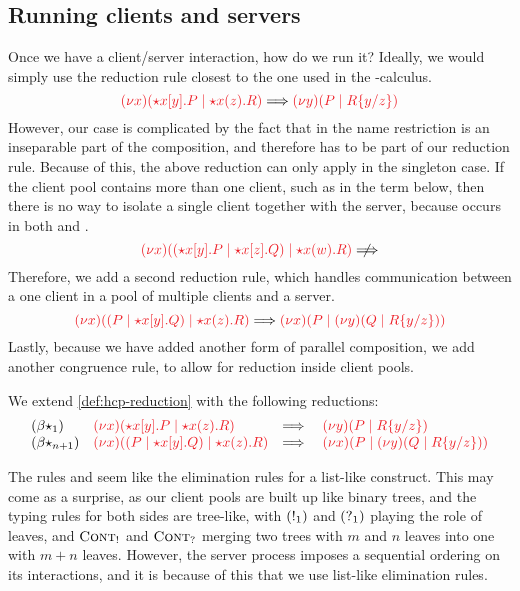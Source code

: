 \documentclass[UKenglish]{llncs}
\begin{document}
\subsection{Running clients and servers}
\label{sec:nc-running-clients-and-servers}
Once we have a client/server interaction, how do we run it? Ideally, we would
simply use the reduction rule closest to the one used in the \textpi-calculus. 
\[
  \reducesto
  {\tm{\cpCut{x}{\ncCnt{x}{y}{P}}{\ncSrv{x}{z}{R}}}}
  {\tm{\cpCut{y}{P}{\cpSub{y}{z}{R}}}}
\]
However, our case is complicated by the fact that in  the
name restriction is an inseparable part of the composition, and therefore has to
be part of our reduction rule. 
Because of this, the above reduction can only apply in the singleton case.
If the client pool contains more than one client, such as in the term below,
then there is no way to isolate a single client together with the server,
because  occurs in both  and .
\[
  \tm{\cpCut{x}{\ncPool{\ncCnt{x}{y}{P}}{\ncCnt{x}{z}{Q}}}{\ncSrv{x}{w}{R}}}
  \centernot\Longrightarrow
\]
Therefore, we add a second reduction rule, which handles communication between a
one client in a pool of multiple clients and a server.
\[
  \reducesto
  {\tm{\cpCut{x}{\ncPool{P}{\ncCnt{x}{y}{Q}}}{\ncSrv{x}{z}{R}}}}
  {\tm{\cpCut{x}{P}{\cpCut{y}{Q}{\cpSub{y}{z}{R}}}}}
\]
Lastly, because we have added another form of parallel composition, we add
another congruence rule, to allow for reduction inside client pools.
\begin{definition}[Reduction]\label{def:nc-reduction}
  We extend \cref{def:hcp-reduction} with the following reductions:
  \[
    \begin{array}{llll}
      \ncRedBetaStar{1}
      & \tm{\cpCut{x}{\ncCnt{x}{y}{P}}{\ncSrv{x}{z}{R}}}
      & \Longrightarrow \;
      & \tm{\cpCut{y}{P}{\cpSub{y}{z}{R}}}
      \\
      \ncRedBetaStar{n+1}
      & \tm{\cpCut{x}{\ncPool{P}{\ncCnt{x}{y}{Q}}}{\ncSrv{x}{z}{R}}}
      & \Longrightarrow \;
      & \tm{\cpCut{x}{P}{\cpCut{y}{Q}{\cpSub{y}{z}{R}}}}
    \end{array}
  \]
\end{definition}
The rules  and  seem like the elimination rules for a list-like construct. This may come as a surprise, as our client pools are built up like binary trees, and the typing rules for both sides are tree-like, with $(\take[1]{})$ and $(\give[1]{})$ playing the role of leaves, and $\textsc{Cont}_{!}$ and $\textsc{Cont}_{?}$ merging two trees with $m$ and $n$ leaves into one with $m+n$ leaves. However, the server process imposes a sequential ordering on its interactions, and it is because of this that we use list-like elimination rules.
\end{document}
